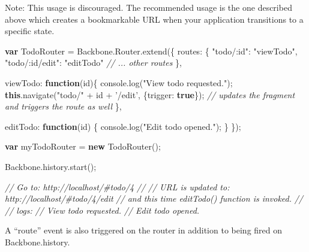 \documentclass[9pt]{book}
\newenvironment{Shaded}{}{}
\newcommand{\KeywordTok}[1]{\textcolor[rgb]{0.00,0.44,0.13}{\textbf{{#1}}}}
\newcommand{\DataTypeTok}[1]{\textcolor[rgb]{0.56,0.13,0.00}{{#1}}}
\newcommand{\StringTok}[1]{\textcolor[rgb]{0.25,0.44,0.63}{{#1}}}
\newcommand{\CommentTok}[1]{\textcolor[rgb]{0.38,0.63,0.69}{\textit{{#1}}}}
\newcommand{\OtherTok}[1]{\textcolor[rgb]{0.00,0.44,0.13}{{#1}}}
\newcommand{\FunctionTok}[1]{\textcolor[rgb]{0.02,0.16,0.49}{{#1}}}
\newcommand{\NormalTok}[1]{{#1}}
\begin{document}
Note: This usage is discouraged. The recommended usage is the one
described above which creates a bookmarkable URL when your application
transitions to a specific state.

\begin{Shaded}
\begin{Highlighting}[]
\KeywordTok{var} \NormalTok{TodoRouter = }\OtherTok{Backbone}\NormalTok{.}\OtherTok{Router}\NormalTok{.}\FunctionTok{extend}\NormalTok{(\{}
  \DataTypeTok{routes}\NormalTok{: \{}
    \StringTok{"todo/:id"}\NormalTok{: }\StringTok{"viewTodo"}\NormalTok{,}
    \StringTok{"todo/:id/edit"}\NormalTok{: }\StringTok{"editTodo"}
    \CommentTok{// ... other routes}
  \NormalTok{\},}

  \DataTypeTok{viewTodo}\NormalTok{: }\KeywordTok{function}\NormalTok{(id)\{}
    \OtherTok{console}\NormalTok{.}\FunctionTok{log}\NormalTok{(}\StringTok{"View todo requested."}\NormalTok{);}
    \KeywordTok{this}\NormalTok{.}\FunctionTok{navigate}\NormalTok{(}\StringTok{"todo/"} \NormalTok{+ id + }\StringTok{'/edit'}\NormalTok{, \{}\DataTypeTok{trigger}\NormalTok{: }\KeywordTok{true}\NormalTok{\}); }\CommentTok{// updates the fragment and triggers the route as well}
  \NormalTok{\},}

  \DataTypeTok{editTodo}\NormalTok{: }\KeywordTok{function}\NormalTok{(id) \{}
    \OtherTok{console}\NormalTok{.}\FunctionTok{log}\NormalTok{(}\StringTok{"Edit todo opened."}\NormalTok{);}
  \NormalTok{\}}
\NormalTok{\});}

\KeywordTok{var} \NormalTok{myTodoRouter = }\KeywordTok{new} \FunctionTok{TodoRouter}\NormalTok{();}

\OtherTok{Backbone}\NormalTok{.}\OtherTok{history}\NormalTok{.}\FunctionTok{start}\NormalTok{();}

\CommentTok{// Go to: http://localhost/#todo/4}
\CommentTok{//}
\CommentTok{// URL is updated to: http://localhost/#todo/4/edit}
\CommentTok{// and this time editTodo() function is invoked.}
\CommentTok{//}
\CommentTok{// logs:}
\CommentTok{// View todo requested.}
\CommentTok{// Edit todo opened.}
\end{Highlighting}
\end{Shaded}

A ``route'' event is also triggered on the router in addition to being
fired on Backbone.history.
\end{document}
